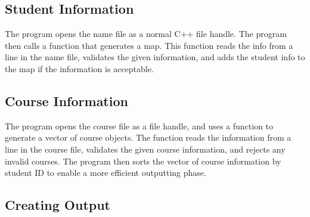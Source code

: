 \documentclass{article}
\begin{document}
\subsection{Student Information}
The program opens the name file as a normal C++ file handle. The program then calls a function that generates a map. This function reads the info from a line in the name file, validates the given information, and adds the student info to the map if the information is acceptable. 

\subsection{Course Information}
The program opens the course file as a file handle, and uses a function to generate a vector of course objects. The function reads the information from a line in the course file, validates the given course information, and rejects any invalid courses. The program then sorts the vector of course information by student ID to enable a more efficient outputting phase.

\subsection{Creating Output}
\end{document}
